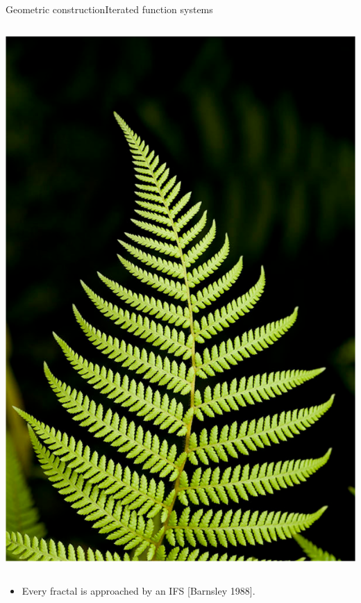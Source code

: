 \documentclass[xcolor=x11names,compress,professionalfonts]{beamer}
\renewcommand{\(}{\begin{columns}}
\renewcommand{\)}{\end{columns}}
\newcommand{\<}[1]{\begin{column}{#1}}
\renewcommand{\>}{\end{column}}
\begin{document}
\begin{frame}{Geometric construction}{Iterated function systems}
\begin{columns}
  \begin{column}{3cm}
  \centering
     \includegraphics[scale=.4]{fern.png}
  \end{column}
\end{columns}

\begin{itemize}
	\item Every fractal is approached by an IFS [Barnsley 1988].
\end{itemize}

\end{frame}
\end{document}
